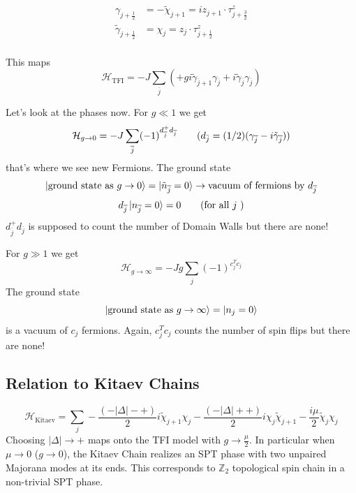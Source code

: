 \documentclass[letterpaper]{article}
\begin{document}
\begin{align}
	\gamma_{j+\frac{1}{2}} &= - \tilde{\chi}_{j+1} = i z_{j+1}\cdot  \tau_{j + \frac{3}{2}} ^{z} \\
	\tilde{\gamma}_{j+\frac{1}{2}} &= \chi_j = z_j \cdot  \tau_{j+\frac{1}{2}}^{z} \\
\end{align}

This maps 
\[
	\mathcal H_\text{TFI} = - J \sum_{\overline{j} } 
\left(+ g i \tilde{\gamma}_{\overline{j}+ 1} \gamma_{\overline{j}} + i \tilde{\gamma}_{\overline{j}} \gamma_{\overline{j}}
\right)
\] 

Let's look at the phases now. For $g \ll 1$ we get 
\[
	\mathcal H_{g \to  0 } 
	=
	- J \sum_{\overline{j}}^{} (-1)^{d^{+}_{\overline{j}} d_{\overline{j}} }
	\tag{$d_{\bar{j}} = (1 / 2) (\gamma_{\overline{j}} - i \tilde{\gamma}_{\overline{j}} )$}
\] 
that's where we see new Fermions. The ground state 
\[
	\ket{\text{ground state as } g\to 0} = 
	\ket{\tilde{n}_{\overline{j}} = 0} \to \text{vacuum of fermions by } d_{\overline{j}} 
\]
\[
	d_{\overline{j}} \ket{n_{\overline{j}} = 0} = 0 \tag{for all $j$ } 
\] 
$d^{+}_{\overline{j}} d_{\overline{j}} $ is supposed to count the number of Domain Walls but there are none!

For $g\gg 1$ we get 
\[
	\mathcal H_{g \to  \infty} = - J g \sum_{j} (-1)^{c^{T}_j c_j }
\] 
The ground state
\[
\ket{\text{ground state as } g \to  \infty } = \ket{n_j = 0 } 
\] 
is a vacuum of $c_j$ fermions. Again, $c_j ^{T} c_j$ counts the number of spin flips but there are none!


\subsection*{Relation to Kitaev Chains} 
\[
	\mathcal H_\text{Kitaev} = 
	\sum_j - \frac{(- | \Delta | - + )}{2} i \tilde{\chi}_{j+1} \chi_{j} - 
	\frac{(- | \Delta | + + )}{2} i \chi_j \tilde{\chi}_{j+1} - \frac{i \mu}{2} \tilde{\chi}_j \chi_j 
\] 
Choosing $|\Delta| \to  +$ maps onto the TFI model with $g \to \frac{\mu }{2}$. In particular when $\mu \to  0$ ($g\to 0$), the Kitaev Chain realizes an SPT phase with two unpaired Majorana modes at its ends. This corresponds to $\mathbb Z_2$ topological spin chain in a non-trivial SPT phase. 
\end{document}
